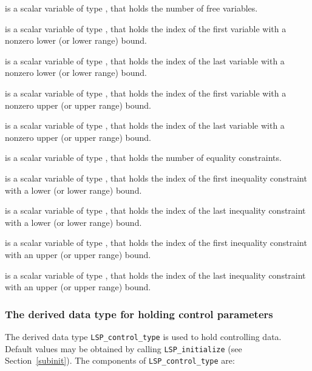 \documentclass{galahad}
\newcommand{\packagename}{LSP}
\begin{document}
\begin{description}
 is a scalar variable of type \integer, that holds the 
number of free variables. 
    
 is a scalar variable of type \integer, that holds the 
index of the first variable with a nonzero lower (or lower range) bound. 
    
 is a scalar variable of type \integer, that holds the 
index of the last variable with a nonzero lower (or lower range) bound. 
    
 is a scalar variable of type \integer, that holds the 
index of the first variable with a nonzero upper (or upper range) bound. 
    
 is a scalar variable of type \integer, that holds the 
index of the last variable with a nonzero upper (or upper range) bound. 
    
 is a scalar variable of type \integer, that holds the 
number of equality constraints. 
    
 is a scalar variable of type \integer, that holds the 
index of the first inequality constraint with a lower (or lower range) bound. 
    
 is a scalar variable of type \integer, that holds the 
index of the last inequality constraint with a lower (or lower range) bound. 
    
 is a scalar variable of type \integer, that holds the 
index of the first inequality constraint with an upper (or upper range) bound. 
    
 is a scalar variable of type \integer, that holds the 
index of the last inequality constraint with an upper (or upper range) bound. 
 
\end{description}


\subsubsection{The derived data type for holding control 
 parameters}\label{typecontrol}
The derived data type 
{\tt \packagename\_control\_type} 
is used to hold controlling data. Default values may be obtained by calling 
{\tt \packagename\_initialize}
(see Section~\ref{subinit}). The components of 
{\tt \packagename\_control\_type} 
are:
\end{document}

